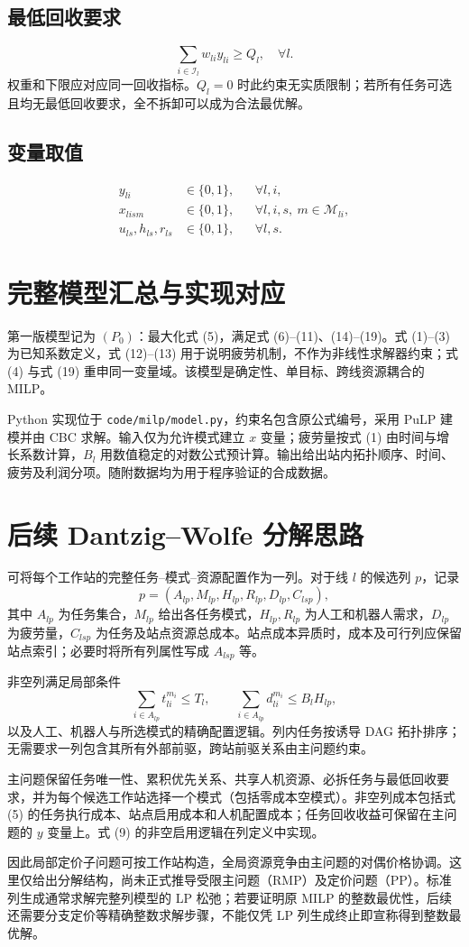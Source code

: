 \documentclass[UTF8,a4paper,11pt]{ctexart}
\begin{document}
\subsection{最低回收要求}
\begin{equation}
\sum_{i\in\mathcal I_l}w_{li}y_{li}\geq Q_l,\quad\forall l.\tag{18}
\end{equation}
权重和下限应对应同一回收指标。$Q_l=0$ 时此约束无实质限制；若所有任务可选且均无最低回收要求，全不拆卸可以成为合法最优解。

\subsection{变量取值}
\begin{equation}
\begin{aligned}
y_{li}&\in\{0,1\},&&\forall l,i,\\
x_{lism}&\in\{0,1\},&&\forall l,i,s,\ m\in\mathcal M_{li},\\
u_{ls},h_{ls},r_{ls}&\in\{0,1\},&&\forall l,s.
\end{aligned}\tag{19}
\end{equation}

\section{完整模型汇总与实现对应}
第一版模型记为 $(P_0)$：最大化式 (5)，满足式 (6)--(11)、(14)--(19)。式 (1)--(3) 为已知系数定义，式 (12)--(13) 用于说明疲劳机制，不作为非线性求解器约束；式 (4) 与式 (19) 重申同一变量域。该模型是确定性、单目标、跨线资源耦合的 MILP。

Python 实现位于 \texttt{code/milp/model.py}，约束名包含原公式编号，采用 PuLP 建模并由 CBC 求解。输入仅为允许模式建立 $x$ 变量；疲劳量按式 (1) 由时间与增长系数计算，$B_l$ 用数值稳定的对数公式预计算。输出给出站内拓扑顺序、时间、疲劳及利润分项。随附数据均为用于程序验证的合成数据。

\section{后续 Dantzig--Wolfe 分解思路}
可将每个工作站的完整任务--模式--资源配置作为一列。对于线 $l$ 的候选列 $p$，记录
\[
p=(A_{lp},M_{lp},H_{lp},R_{lp},D_{lp},C_{lsp}),
\]
其中 $A_{lp}$ 为任务集合，$M_{lp}$ 给出各任务模式，$H_{lp},R_{lp}$ 为人工和机器人需求，$D_{lp}$ 为疲劳量，$C_{lsp}$ 为任务及站点资源总成本。站点成本异质时，成本及可行列应保留站点索引；必要时将所有列属性写成 $A_{lsp}$ 等。

非空列满足局部条件
\[
\sum_{i\in A_{lp}}t_{li}^{m_i}\leq T_l,\qquad
\sum_{i\in A_{lp}}d_{li}^{m_i}\leq B_lH_{lp},
\]
以及人工、机器人与所选模式的精确配置逻辑。列内任务按诱导 DAG 拓扑排序；无需要求一列包含其所有外部前驱，跨站前驱关系由主问题约束。

主问题保留任务唯一性、累积优先关系、共享人机资源、必拆任务与最低回收要求，并为每个候选工作站选择一个模式（包括零成本空模式）。非空列成本包括式 (5) 的任务执行成本、站点启用成本和人机配置成本；任务回收收益可保留在主问题的 $y$ 变量上。式 (9) 的非空启用逻辑在列定义中实现。

因此局部定价子问题可按工作站构造，全局资源竞争由主问题的对偶价格协调。这里仅给出分解结构，尚未正式推导受限主问题（RMP）及定价问题（PP）。标准列生成通常求解完整列模型的 LP 松弛；若要证明原 MILP 的整数最优性，后续还需要分支定价等精确整数求解步骤，不能仅凭 LP 列生成终止即宣称得到整数最优解。
\end{document}

